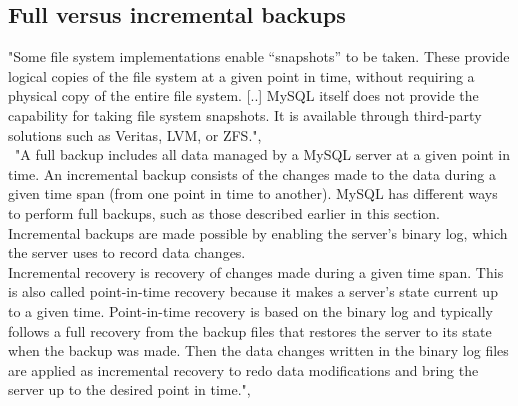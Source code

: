 \documentclass[10pt]{article}
\begin{document}
\subsection{Full versus incremental backups}
"Some file system implementations enable “snapshots” to be taken. These provide logical copies of the file system at a given point in time, without requiring a physical copy of the entire file system. [..] MySQL itself does not provide the capability for taking file system snapshots. It is available through third-party solutions such as Veritas, LVM, or ZFS.", \cite{mysqlbackupandrectypesman}
\\ \
"A full backup includes all data managed by a MySQL server at a given point in time. An incremental backup consists of the changes made to the data during a given time span (from one point in time to another). MySQL has different ways to perform full backups, such as those described earlier in this section. Incremental backups are made possible by enabling the server's binary log, which the server uses to record data changes. \\
Incremental recovery is recovery of changes made during a given time span. This is also called point-in-time recovery because it makes a server's state current up to a given time. Point-in-time recovery is based on the binary log and typically follows a full recovery from the backup files that restores the server to its state when the backup was made. Then the data changes written in the binary log files are applied as incremental recovery to redo data modifications and bring the server up to the desired point in time.", \cite{mysqlbackupandrectypesman}
\end{document}

